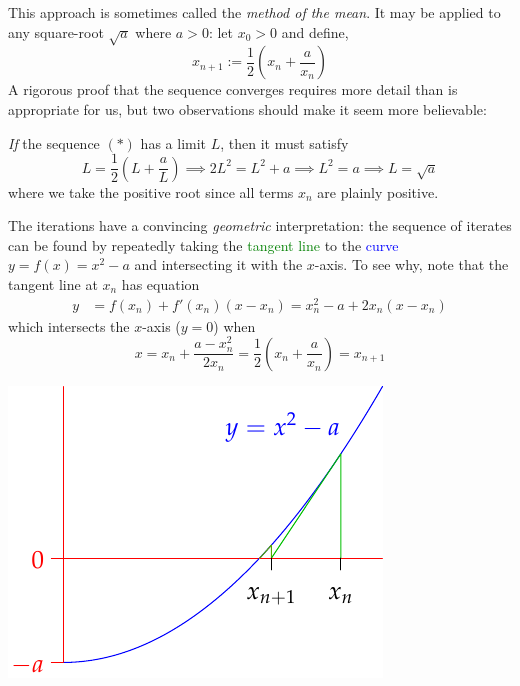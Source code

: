 This approach is sometimes called the \emph{method of the mean}. It may be applied to any square-root $\sqrt a$ where $a>0$: let $x_0>0$ and define,
\[
	x_{n+1}:=\frac 12\left(x_n+\frac a{x_n}\right) \tag{$\ast$}
\]
A rigorous proof that the sequence converges requires more detail than is appropriate for us, but two observations should make it seem more believable:
\begin{enumerate}
  \item \emph{If} the sequence $(\ast)$ has a limit $L$, then it must satisfy
  \[
  	L=\frac 12\left(L+\frac aL\right) \implies 2L^2=L^2+a\implies L^2=a\implies L=\sqrt a
  \]
  where we take the positive root since all terms $x_n$ are plainly positive.
  
  \begin{minipage}[t]{0.64\linewidth}\vspace{0pt}
  	\item The iterations have a convincing \emph{geometric} interpretation: the sequence of iterates can be found by repeatedly taking the \textcolor{Green}{tangent line} to the \textcolor{blue}{curve} $y=f(x)=x^2-a$ and intersecting it with the $x$-axis. To see why, note that the tangent line at $x_n$ has equation
  	\begin{align*}
  		y&=f(x_n)+f'(x_n)(x-x_n)=x_n^2-a+2x_n(x-x_n)
  	\end{align*}
  	which intersects the $x$-axis ($y=0$) when
  	\[
  		x=x_n+\frac{a-x_n^2}{2x_n}=\frac 12\left(x_n+\frac a{x_n}\right) =x_{n+1}
  	\] 
  \end{minipage}
  \hfill
  \begin{minipage}[t]{0.35\linewidth}\vspace{0pt}
  	\flushright\includegraphics[scale=0.95]{newton-raphson}
  \end{minipage}
\end{enumerate}

